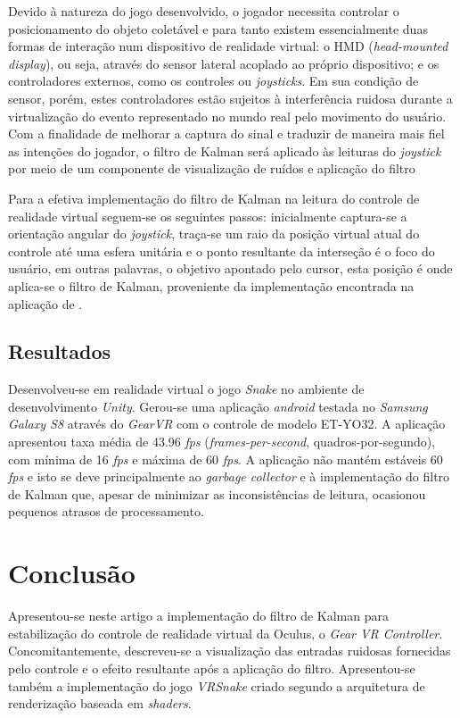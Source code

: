 \documentclass{vgtc}                          %
\begin{document}
Devido à natureza do jogo desenvolvido, o jogador necessita controlar o posicionamento do objeto coletável e para tanto existem essencialmente duas formas de interação num dispositivo de realidade virtual: o HMD (\textit{head-mounted display}), ou seja, através do sensor lateral acoplado ao próprio dispositivo; e os controladores externos, como os controles ou \textit{joysticks}. Em sua condição de sensor, porém, estes controladores estão sujeitos à interferência ruidosa durante a virtualização do evento representado no mundo real pelo movimento do usuário. Com a finalidade de melhorar a captura do sinal e traduzir de maneira mais fiel as intenções do jogador, o filtro de Kalman será aplicado às leituras do \textit{joystick} por meio de um componente de visualização de ruídos e aplicação do filtro

Para a efetiva implementação do filtro de Kalman na leitura do controle de realidade virtual seguem-se os seguintes passos: inicialmente captura-se a orientação angular do \textit{joystick}, traça-se um raio da posição virtual atual do controle até uma esfera unitária e o ponto resultante da interseção é o foco do usuário, em outras palavras, o objetivo apontado pelo cursor, esta posição é onde aplica-se o filtro de Kalman, proveniente da implementação encontrada na aplicação de \cite{KalmanComponent}.

\subsection{Resultados} \label{sec:results}

Desenvolveu-se em realidade virtual o jogo \textit{Snake} no ambiente de desenvolvimento \textit{Unity}. Gerou-se uma aplicação \textit{android} testada no \textit{Samsung Galaxy S8} através do \textit{GearVR} com o controle de modelo ET-YO32. A aplicação apresentou taxa média de 43.96 \textit{fps} (\textit{frames-per-second}, quadros-por-segundo), com mínima de 16 \textit{fps} e máxima de 60 \textit{fps}. A aplicação não mantém estáveis 60 \textit{fps} e isto se deve principalmente ao \textit{garbage collector} e à implementação do filtro de Kalman que, apesar de minimizar as inconsistências de leitura, ocasionou pequenos atrasos de processamento.


\section{Conclusão} \label{sec:conclusion}

Apresentou-se neste artigo a implementação do filtro de Kalman para estabilização do controle de realidade virtual da Oculus, o \textit{Gear VR Controller}. Concomitantemente, descreveu-se a visualização das entradas ruidosas fornecidas pelo controle e o efeito resultante após a aplicação do filtro. Apresentou-se também a implementação do jogo \textit{VRSnake} criado segundo a arquitetura de renderização baseada em \textit{shaders}.
\end{document}

